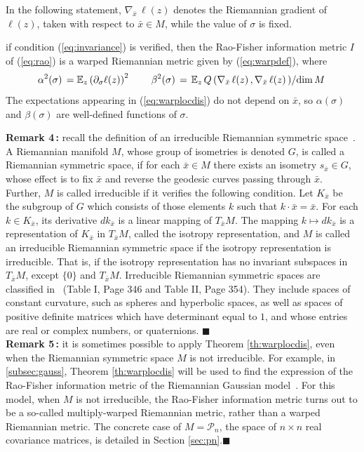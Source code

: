 \documentclass{svmult}
\begin{document}
In the following statement, $\nabla_{\bar{x}}\,\ell(z)$ denotes the Riemannian gradient of $\ell(z)$, taken with respect to $\bar{x} \in M$, while the value of $\sigma$ is fixed. 
\begin{theorem} \label{th:warplocdis}
if condition (\ref{eq:invariance}) is verified, then the Rao-Fisher information metric $I$ of (\ref{eq:rao}) is a warped Riemannian metric given by (\ref{eq:warpdef}), where  
\begin{equation} \label{eq:warplocdis} 
  \alpha^2(\sigma) \,=\mathbb{E}_z\left(\partial_\sigma\ell(z)\right)^2 \hspace{0.75cm} \beta^2(\sigma) \,= \left. \mathbb{E}_z\, Q\left(\nabla_{\bar{x}}\,\ell(z)\,,\nabla_{\bar{x}}\,\ell(z)\,\right) \middle/ \mathrm{dim}\,M \right.
\end{equation}
The expectations appearing in (\ref{eq:warplocdis}) do not depend on $\bar{x}$, so $\alpha(\sigma)$ and $\beta(\sigma)$ are well-defined functions of $\sigma$.
\end{theorem}
\vspace{0.13cm}
\textbf{Remark 4\,:} recall the definition of an irreducible Riemannian symmetric space~\cite{helgason}. A Riemannian manifold $M$, whose group of isometries is denoted $G$, is called a Riemannian symmetric space, if for each $\bar{x} \in M$ there exists an isometry $s_{\bar{x}} \in G$, whose effect is to fix $\bar{x}$ and reverse the geodesic curves passing through $\bar{x}$. Further, $M$ is called irreducible if it verifies the following condition. Let $K_{\bar{x}}$ be the subgroup of $G$ which consists of those elements $k$ such that $k\cdot\bar{x} = \bar{x}$. For each $k \in K_{\bar{x}}$, its derivative $dk_{\bar{x}}$ is a linear mapping of $T_{\bar{x}}M$. The mapping $k \mapsto dk_{\bar{x}}$ is a representation of $K_{\bar{x}}$ in $T_{\bar{x}}M$, called the isotropy representation, and $M$ is called an irreducible Riemannian symmetric space if the isotropy representation is irreducible. That is, if the isotropy representation has no invariant subspaces in $T_{\bar{x}}M$, except $\lbrace 0 \rbrace$ and $T_{\bar{x}}M$. Irreducible Riemannian symmetric spaces are classified in~\cite{helgason} (Table I, Page 346 and Table II, Page 354). They include spaces of constant curvature, such as spheres and hyperbolic spaces, as well as spaces of positive definite matrices which have determinant equal to $1$, and whose entries are real or complex numbers, or quaternions. \hfill$\blacksquare$\\[0.1cm]
\textbf{Remark 5\,:} it is sometimes possible to apply Theorem \ref{th:warplocdis}, even when the Riemannian symmetric space $M$ is not irreducible. For example, in \ref{subsec:gauss}, Theorem \ref{th:warplocdis} will be used to find the expression of the Rao-Fisher information metric of the Riemannian Gaussian model~\cite{vemuri,said1,said2}. For this model, when $M$ is not irreducible, the Rao-Fisher information metric turns out to be a so-called multiply-warped Riemannian metric, rather than a warped Riemannian metric. The concrete case of $M = \mathcal{P}_n$, the space of $n \times n$ real covariance matrices, is detailed in Section \ref{sec:pn}.\hfill$\blacksquare$\\[0.1cm]
\end{document}
